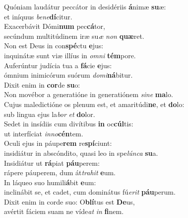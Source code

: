 \evenverse Quóniam laudátur peccátor in desidériis \textbf{á}nimæ \textbf{su}æ:~\*\\
\evenverse et iníquus \textit{be}\textit{ne}\textbf{dí}citur.\\
\oddverse Exacerbávit Dómi\textbf{num} pec\textbf{cá}tor,~\*\\
\oddverse secúndum multitúdinem iræ su\textit{æ} \textit{non} \textbf{quæ}ret.\\
\evenverse Non est Deus in con\textbf{spé}ctu \textbf{e}jus:~\*\\
\evenverse inquinátæ sunt viæ illíus in \textit{om}\textit{ni} \textbf{tém}pore.\\
\oddverse Auferúntur judícia tua a \textbf{fá}cie \textbf{e}jus:~\*\\
\oddverse ómnium inimicórum suórum \textit{do}\textit{mi}\textbf{ná}bitur.\\
\evenverse Dixit enim in \textbf{cor}de \textbf{su}o:~\*\\
\evenverse Non movébor a generatióne in generatiónem \textit{si}\textit{ne} \textbf{ma}lo.\\
\oddverse Cujus maledictióne os plenum est, et amaritúdi\textbf{ne}, et \textbf{do}lo:~\*\\
\oddverse sub lingua ejus la\textit{bor} \textit{et} \textbf{do}lor.\\
\evenverse Sedet in insídiis cum divítibus \textbf{in} oc\textbf{cúl}tis:~\*\\
\evenverse ut interfíciat \textit{in}\textit{no}\textbf{cén}tem.\\
\oddverse Oculi ejus in páupe\textbf{rem} re\textbf{spí}ciunt:~\*\\
\oddverse insidiátur in abscóndito, quasi leo in spe\textit{lún}\textit{ca} \textbf{su}a.\\
\evenverse Insidiátur ut \textbf{rá}piat \textbf{páu}perem:~\*\\
\evenverse rápere páuperem, dum át\textit{tra}\textit{hit} \textbf{e}um.\\
\oddverse In láqueo suo humili\textbf{á}bit \textbf{e}um:~\*\\
\oddverse inclinábit se, et cadet, cum dominátus fú\textit{e}\textit{rit} \textbf{páu}perum.\\
\evenverse Dixit enim in corde suo: O\textbf{blí}tus est \textbf{De}us,~\*\\
\evenverse avértit fáciem suam ne víde\textit{at} \textit{in} \textbf{fi}nem.\\
